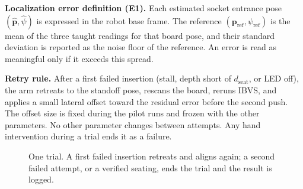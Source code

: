 \documentclass[11pt,conference]{IEEEtran}
\begin{document}
\textbf{Localization error definition (E1).} Each estimated socket entrance pose $(\hat{\mathbf p},\hat\psi)$ is expressed in the robot base frame. The reference $(\mathbf p_{\mathrm{ref}},\psi_{\mathrm{ref}})$ is the mean of the three taught readings for that board pose, and their standard deviation is reported as the noise floor of the reference. An error is read as meaningful only if it exceeds this spread.

\textbf{Retry rule.} After a first failed insertion (stall, depth short of $d_{\mathrm{seat}}$, or LED off), the arm retreats to the standoff pose, rescans the board, reruns IBVS, and applies a small lateral offset toward the residual error before the second push. The offset size is fixed during the pilot runs and frozen with the other parameters. No other parameter changes between attempts. Any hand intervention during a trial ends it as a failure.

\begin{figure}[H]
\centering
{}
\caption{One trial. A first failed insertion retreats and aligns again; a second failed attempt, or a verified seating, ends the trial and the result is logged.}
\label{fig:procedure}
\end{figure}
\end{document}
